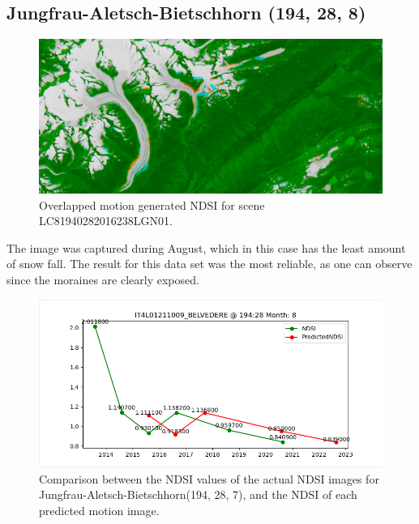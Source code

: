 \documentclass[12pt, a4paper]{report}
\begin{document}
	\newpage{}
	
	\subsection{Jungfrau-Aletsch-Bietschhorn (194, 28, 8)}
	
	\begin{figure}[h!]
		\centering
		\includegraphics[width=\linewidth]{../images/experiment_1940288_image.png}
		\caption{Overlapped motion generated NDSI for scene LC81940282016238LGN01.}
		\label{fig:experiment_1940288_image}
	\end{figure}

	The image was captured during August, which in this case has the least amount of snow fall. The result for this data set was the most reliable, as one can observe since the moraines are clearly exposed. 
	
	\begin{figure}[h!]
		\centering
		\includegraphics[scale=0.5]{../images/experiment_194288.png}
		\caption{Comparison between the NDSI values of the actual NDSI images for Jungfrau-Aletsch-Bietschhorn(194, 28, 7), and the NDSI of each predicted motion image.}
		\label{fig:jungfrau_194288}
	\end{figure}
	
	
\end{document}
